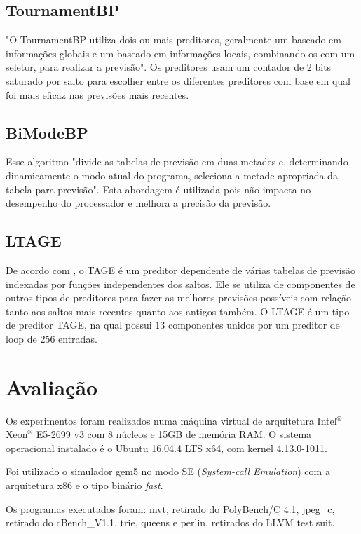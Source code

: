 \documentclass[12pt]{article}
\begin{document}
\subsection{TournamentBP}

"O TournamentBP utiliza dois ou mais preditores, geralmente um baseado em informações globais e um baseado em informações locais, combinando-os com um seletor, para realizar a previsão"\cite{hennessy2011computer}. Os preditores usam um contador de 2 bits saturado por salto para escolher entre os diferentes preditores com base em qual foi mais eficaz nas previsões mais recentes. 

\subsection{BiModeBP}

Esse algoritmo "divide as tabelas de previsão em duas metades e, determinando dinamicamente o modo atual do programa, seleciona a metade apropriada da tabela para previsão"\cite{lee1997bi}. Esta abordagem é utilizada pois não impacta no desempenho do processador e melhora a precisão da previsão.

\subsection{LTAGE}

De acordo com \cite{seznec2007256},	o TAGE é um preditor dependente de várias tabelas de previsão indexadas por funções independentes dos saltos. Ele se utiliza de componentes de outros tipos de preditores para fazer as melhores previsões possíveis com relação tanto aos saltos mais recentes quanto aos antigos também. O LTAGE é um tipo de preditor TAGE, na qual possui 13 componentes unidos por um preditor de loop de 256 entradas.

\section{Avaliação}

Os experimentos foram realizados numa máquina virtual de arquitetura Intel$^{®}$ Xeon$^{®}$ E5-2699
v3 com 8 núcleos e 15GB de memória RAM. O sistema operacional instalado é o Ubuntu 16.04.4 LTS x64, com kernel 4.13.0-1011. 

Foi utilizado o simulador gem5 no modo SE (\textit{System-call Emulation}) com a arquitetura x86 e o tipo binário \textit{fast}.

Os programas executados foram: mvt, retirado do PolyBench/C 4.1, jpeg\_c, retirado do cBench\_V1.1, trie, queens e perlin, retirados do LLVM test suit.
\end{document}
